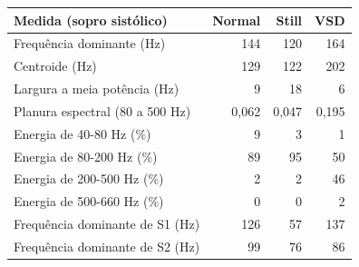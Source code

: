\begin{tabular}{lrrr}
\toprule
\textbf{Medida (sopro sistólico)} & \textbf{Normal} & \textbf{Still} & \textbf{VSD} \\
\midrule
Frequência dominante (Hz) & 144 & 120 & 164 \\
Centroide (Hz) & 129 & 122 & 202 \\
Largura a meia potência (Hz) & 9 & 18 & 6 \\
Planura espectral (80 a 500 Hz) & 0{,}062 & 0{,}047 & 0{,}195 \\
Energia de 40-80 Hz (\%) & 9 & 3 & 1 \\
Energia de 80-200 Hz (\%) & 89 & 95 & 50 \\
Energia de 200-500 Hz (\%) & 2 & 2 & 46 \\
Energia de 500-660 Hz (\%) & 0 & 0 & 2 \\
Frequência dominante de S1 (Hz) & 126 & 57 & 137 \\
Frequência dominante de S2 (Hz) & 99 & 76 & 86 \\
\bottomrule
\end{tabular}
